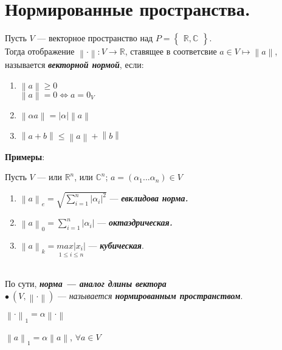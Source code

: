 \documentclass[a4paper, 12pt]{report}
\begin{document}
	\section{Нормированные пространства.}
	Пусть $V$ --- векторное пространство над $P=\begin{Bmatrix}\mathbb{R,C}\end{Bmatrix}$.\\
	Тогда отображение $\left \| \cdot  \right \|:V\rightarrow \mathbb{R}$, ставящее в соответсвие $a \in V \mapsto \left \|a\right \|$, называется \textbf{\textit{векторной нормой}}, если:
	\begin{enumerate}
		\item $\left \|a\right \| \geqslant 0$\\
		$\left \|a\right \| = 0 \Leftrightarrow a = 0_V$
		\item $\left \|\alpha a\right \|=|\alpha|\left \|a\right \|$
		
		\item  $\left \|a+b\right \| \leqslant \left \|a\right \| + \left \|b\right \|$
	\end{enumerate}
	\par\bigskip
	\textbf{Примеры}:
	\par\bigskip
	Пусть $V$ --- или $\mathbb{R}^n$, или $\mathbb{C}^n$; $a=(\alpha_1...\alpha_n) \in V$
	\begin{enumerate}
		\item $\left \|a\right \|_e=\sqrt{\sum\limits_{i=1}^{n}{|\alpha_i}|^2}$ --- \textbf{\textit{евклидова норма.}}\\
		
		\item $\left \|a\right \|_0=\sum\limits_{i=1}^{n}{|\alpha_i}|$ --- \textit{\textbf{октаэдрическая.}}
		
		\item  $\left \|a\right \|_k=\underset{1 \leqslant i \leqslant n}{max|x_i|}$ --- \textbf{\textit{кубическая}}.
	\end{enumerate}
	\hspace{0pt}\\
	По сути,\textit{\textbf{ норма --- аналог длины вектора}}\\
	$\bullet\ (V, \left \| \cdot \right \|)$ ---\textit{ называется \textbf{нормированным пространством}}.
	\par\bigskip
	$\left \| \cdot \right \|_1=\alpha\left \| \cdot \right \|$
	\par\bigskip
	$\left \| a \right \|_1=\alpha\left \| a \right \|$, $\forall a \in V$
\end{document}
